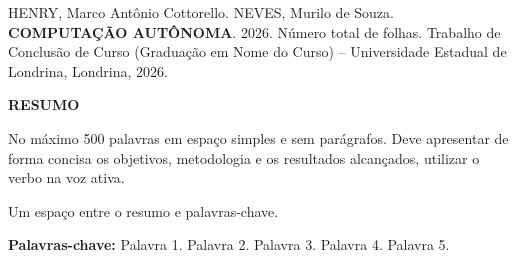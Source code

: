 \noindent HENRY, Marco Antônio Cottorello. NEVES, Murilo de Souza.
\textbf{COMPUTAÇÃO AUTÔNOMA}. 2026.
Número total de folhas. Trabalho de Conclusão de Curso
(Graduação em Nome do Curso) -- Universidade Estadual de Londrina,
Londrina, 2026.

\vspace{2\baselineskip}

\begin{center}
  \textbf{RESUMO}
\end{center}

\vspace{\baselineskip}

\noindent No máximo 500 palavras em espaço simples e sem parágrafos.
Deve apresentar de forma concisa os objetivos, metodologia e os
resultados alcançados, utilizar o verbo na voz ativa.

\vfill

\noindent Um espaço entre o resumo e palavras-chave.

\noindent\textbf{Palavras-chave:} Palavra 1. Palavra 2. Palavra 3.
Palavra 4. Palavra 5.
